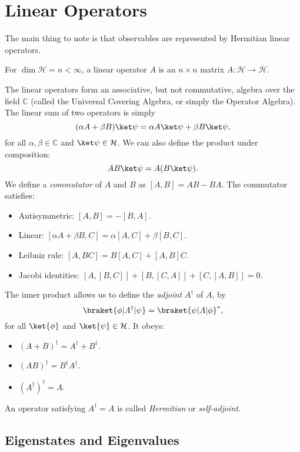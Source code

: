 \documentclass[12pt]{article}
\begin{document}
\newpage

\section{Linear Operators}
\label{sec:linear_operators}

The main thing to note is that observables are represented by Hermitian linear operators.

For $\dim \mathcal{H} = n < \infty$, a linear operator $A$ is an $n \times n$ matrix $A : \mathcal{H} \to \mathcal{H}$.

The linear operators form an associative, but not commutative, algebra over the field $\mathbb{C}$ (called the Universal Covering Algebra, or simply the Operator Algebra). The linear sum of two operators is simply
\[
	(\alpha A + \beta B) \ket \psi = \alpha A \ket \psi + \beta B \ket \psi,
\]
for all $\alpha, \beta \in \mathbb{C}$ and $\ket \psi \in \mathcal{H}$. We can also define the product under composition:
\[
AB \ket \psi = A( B \ket \psi).
\]
We define a \emph{commutator} of $A$ and $B$ as $[A,B] = AB - BA$. The commutator satisfies:
\begin{itemize}
	\item Antisymmetric: $[A, B] = - [B, A]$.
	\item Linear: $[\alpha A + \beta B, C] = \alpha[A, C] + \beta[B, C]$.
	\item Leibniz rule: $[A,BC] = B[A,C] + [A,B]C$.
	\item Jacobi identities: $[A,[B,C]] + [B,[C,A]] + [C,[A,B]] = 0$.
\end{itemize}


The inner product allows us to define the \emph{adjoint} $A^{\dagger}$ of $A$, by
\[
	\braket{\phi|A^{\dagger}|\psi} = \braket{\psi|A|\phi}^{\ast},
\]
for all $\ket{\phi}$ and $\ket{\psi} \in \mathcal{H}$. It obeys:
\begin{itemize}
	\item $(A+B)^{\dagger} = A^{\dagger} + B^{\dagger}$.
	\item $(AB)^{\dagger} = B^{\dagger} A^{\dagger}$.
	\item $(A^{\dagger})^{\dagger} = A$.
\end{itemize}
An operator satisfying $A^{\dagger} = A$ is called \emph{Hermitian} or \emph{self-adjoint}.

\subsection{Eigenstates and Eigenvalues}
\label{sub:eigen}
\end{document}

